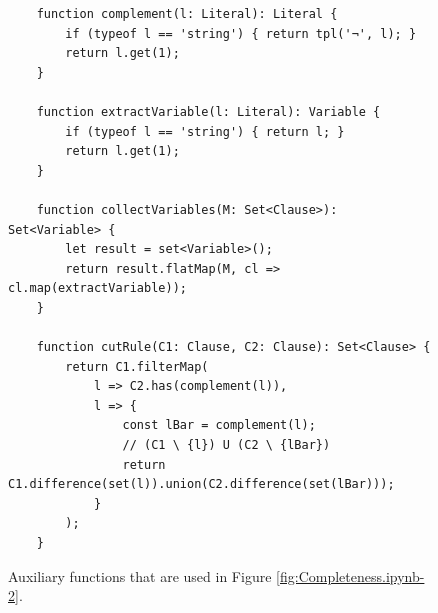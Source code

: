 \begin{figure}[!ht]
\centering
\begin{verbatim}
    function complement(l: Literal): Literal {
        if (typeof l == 'string') { return tpl('¬', l); } 
        return l.get(1);
    }
    
    function extractVariable(l: Literal): Variable {
        if (typeof l == 'string') { return l; } 
        return l.get(1);
    }
      
    function collectVariables(M: Set<Clause>): Set<Variable> {
        let result = set<Variable>();
        return result.flatMap(M, cl => cl.map(extractVariable));
    }
    
    function cutRule(C1: Clause, C2: Clause): Set<Clause> {
        return C1.filterMap(
            l => C2.has(complement(l)),
            l => {
                const lBar = complement(l);
                // (C1 \ {l}) U (C2 \ {lBar})
                return C1.difference(set(l)).union(C2.difference(set(lBar)));
            }
        );
    }
\end{verbatim}
\vspace*{-0.3cm}
\caption{Auxiliary functions that are used in Figure \ref{fig:Completeness.ipynb-2}.}
\label{fig:Completeness.ipynb-1}
\end{figure}

